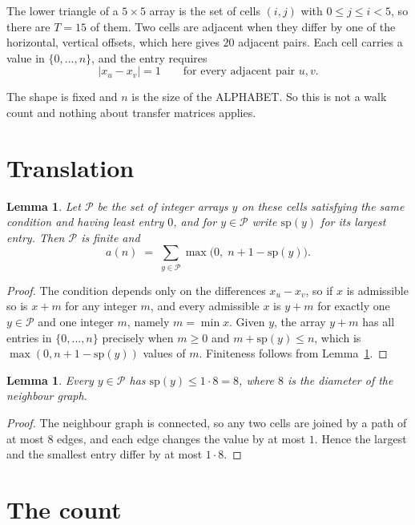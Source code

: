 \documentclass[11pt,a4paper]{article}
\theoremstyle{plain}
\newtheorem{lemma}[theorem]{Lemma}
\theoremstyle{definition}
\begin{document}
The lower triangle of a $5\times5$ array is the set of cells $(i,j)$ with $0\le j\le
i<5$, so there are $T=15$ of them. Two cells are adjacent when they differ by one of the
horizontal, vertical offsets, which here gives $20$ adjacent pairs. Each cell carries a value in
$\{0,\dots,n\}$, and the entry requires
\[
|x_u-x_v|=1\qquad\text{for every adjacent pair }u,v .
\]

The shape is fixed and $n$ is the size of the ALPHABET. So this is not a walk count and
nothing about transfer matrices applies.

\section{Translation}

\begin{lemma}\label{lem:trans}
Let $\mathcal P$ be the set of integer arrays $y$ on these cells satisfying the same condition
and having least entry $0$, and for $y\in\mathcal P$ write $\mathrm{sp}(y)$ for its largest
entry. Then $\mathcal P$ is finite and
\[
a(n)\;=\;\sum_{y\in\mathcal P}\max\bigl(0,\;n+1-\mathrm{sp}(y)\bigr).
\]
\end{lemma}

\begin{proof}
The condition depends only on the differences $x_u-x_v$, so if $x$ is admissible so is $x+m$
for any integer $m$, and every admissible $x$ is $y+m$ for exactly one $y\in\mathcal P$ and one
integer $m$, namely $m=\min x$. Given $y$, the array $y+m$ has all entries in
$\{0,\dots,n\}$ precisely when $m\ge0$ and $m+\mathrm{sp}(y)\le n$, which is
$\max(0,n+1-\mathrm{sp}(y))$ values of $m$. Finiteness follows from
Lemma~\ref{lem:bound}.
\end{proof}

\begin{lemma}\label{lem:bound}
Every $y\in\mathcal P$ has $\mathrm{sp}(y)\le 1\cdot8=8$, where $8$ is the
diameter of the neighbour graph.
\end{lemma}

\begin{proof}
The neighbour graph is connected, so any two cells are joined by a path of at most $8$
edges, and each edge changes the value by at most $1$. Hence the largest and the smallest
entry differ by at most $1\cdot8$.
\end{proof}

\section{The count}
\end{document}
